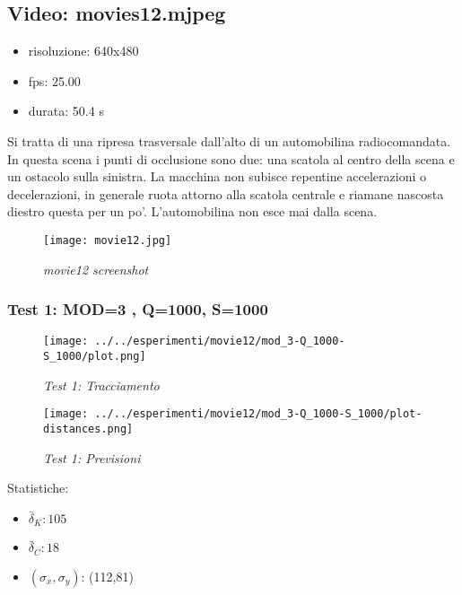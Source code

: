 \newpage

\subsection{Video: movies12.mjpeg}
\begin{itemize}
\item risoluzione: 640x480
\item fps: 25.00
\item durata: 50.4 s
\end{itemize}

Si tratta di una ripresa trasversale dall'alto di un automobilina radiocomandata. In questa scena i punti di occlusione sono due: una scatola al centro della scena e un ostacolo sulla sinistra. La macchina non subisce repentine accelerazioni o decelerazioni, in generale ruota attorno alla scatola centrale e riamane nascosta diestro questa per un po'. L'automobilina non esce mai dalla scena.

\begin{figure}[hb]
\centering
	\texttt{[image: movie12.jpg]}
\caption{\textit{movie12 screenshot}\label{fig:movie12 screenshot}}
\end{figure}
 
\newpage

\subsubsection{Test 1: MOD=3 , Q=1000, S=1000}

\begin{figure}[hb]
\centering
	\texttt{[image: ../../esperimenti/movie12/mod\_3-Q\_1000-S\_1000/plot.png]}
\caption{\textit{Test 1: Tracciamento}\label{fig:Test 1}}
\end{figure}

\begin{figure}[hb]
\centering
	\texttt{[image: ../../esperimenti/movie12/mod\_3-Q\_1000-S\_1000/plot-distances.png]}
\caption{\textit{Test 1: Previsioni}\label{fig:Test 1}}
\end{figure}

Statistiche:
\begin{itemize}
\item \begin{math} \bar \delta_K: 105 \end{math}
\item \begin{math} \bar \delta_C: 18 \end{math}
\item \begin{math}(\sigma_x,\sigma_y)\end{math}: (112,81)
\end{itemize}

